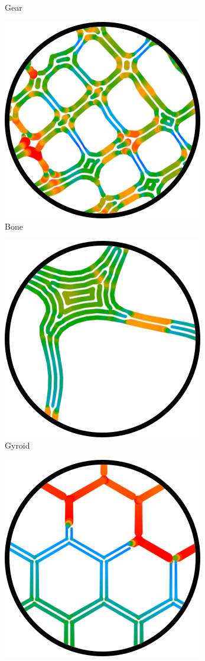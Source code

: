 \begin{figure}
\begin{subfigure}{\figwidth}
\caption{Gear}\label{applications_gear}
\end{subfigure}
\begin{subfigure}{\figwidth}\centering
\includegraphics[height=\figheight]{sources/applications/topopt_bone.png}
\caption{Bone}\label{applications_bone}
\end{subfigure}
\begin{subfigure}{\figwidth}\centering
\includegraphics[height=\figheight]{sources/applications/gyroid.png}
\caption{Gyroid}\label{applications_gyroid}
\end{subfigure}
\begin{subfigure}{\figwidth}\centering
\includegraphics[height=\figheight]{sources/applications/hex_grid.png}

\end{subfigure}
\end{figure}
